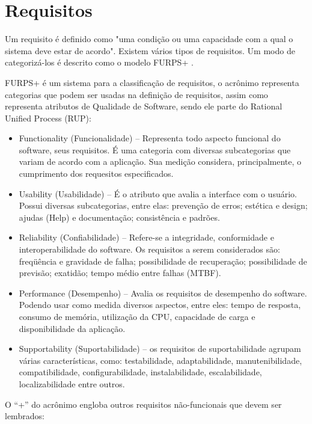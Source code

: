   \section {Requisitos}
  \label{Sec:Requisitos}
    Um requisito é definido como "uma condição ou uma capacidade com a qual o
  sistema deve estar de acordo". Existem vários tipos de
  requisitos. Um modo de categorizá-los é descrito como o modelo
  FURPS+ \cite{robertGrady}.

  FURPS+ é um sistema para a classificação de requisitos, o acrônimo representa categorias que podem ser usadas na definição de requisitos, assim como representa atributos de Qualidade de Software, sendo ele parte do Rational Unified Process (RUP):
\begin{itemize}

\item Functionality (Funcionalidade) – Representa todo aspecto funcional do software, seus requisitos. É uma categoria com diversas subcategorias que variam de acordo com a aplicação. Sua medição considera, principalmente, o cumprimento dos requesitos especificados.

\item Usability (Usabilidade) – É o atributo que avalia a interface com o usuário. Possui diversas subcategorias, entre elas: prevenção de erros; estética e design; ajudas (Help) e documentação; consistência e padrões.

\item Reliability (Confiabilidade) – Refere-se a integridade, conformidade e interoperabilidade do software. Os requisitos a serem considerados são: freqüência e gravidade de falha; possibilidade de recuperação; possibilidade de previsão; exatidão; tempo médio entre falhas (MTBF).

\item Performance (Desempenho) – Avalia os requisitos de desempenho do software. Podendo usar como medida diversos aspectos, entre eles: tempo de resposta, consumo de memória, utilização da CPU, capacidade de carga e disponibilidade da aplicação.

\item Supportability (Suportabilidade) – os requisitos de suportabilidade agrupam várias características, como: testabilidade, adaptabilidade, manutenibilidade, compatibilidade, configurabilidade, instalabilidade, escalabilidade, localizabilidade entre outros.
\end{itemize}
O “+” do acrônimo engloba outros requisitos não-funcionais que devem ser lembrados:
